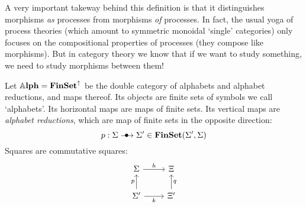 A very important takeway behind this definition is that it distinguishes morphisms \emph{as} processes from morphisms \emph{of} processes. In fact, the usual yoga of process theories (which amount to symmetric monoidal `single' categories) only focuses on the compositional properties of processes (they compose like morphisms). But in category theory we know that if we want to study something, we need to study morphisms between them!

\begin{example}[Alphabets]
\label{ex:alphabets}
	Let $\Alph = \FinSet^\uparrow$ be the double category of alphabets and alphabet reductions, and maps thereof. Its objects are finite sets of symbols we call `alphabets'. Its horizontal maps are maps of finite sets. Its vertical maps are \emph{alphabet reductions}, which are map of finite sets in the opposite direction:
	\begin{equation}
		p : \Sigma \verto \Sigma' \in \FinSet(\Sigma', \Sigma)
	\end{equation}
	Squares are commutative squares:
	\begin{equation}
		\begin{tikzcd}[ampersand replacement=\&]
			\Sigma \& \Xi \\
			{\Sigma'} \& {\Xi'}
			\arrow["p", from=2-1, to=1-1]
			\arrow["q"', from=2-2, to=1-2]
			\arrow["h", from=1-1, to=1-2]
			\arrow["k"', from=2-1, to=2-2]
		\end{tikzcd}
	\end{equation}
\end{example}


